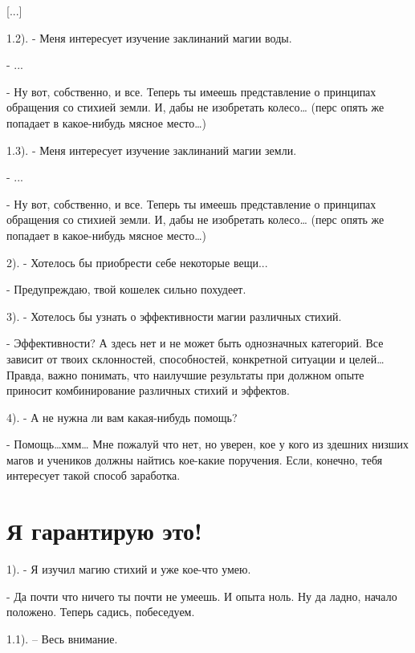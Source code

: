 \documentclass[12pt,a4paper]{book}
\begin{document}
[...]

1.2). - Меня интересует изучение заклинаний магии воды.

- ...

- Ну вот, собственно, и все. Теперь ты имеешь представление о принципах обращения со стихией земли. И, дабы не изобретать колесо… (перс опять же попадает в какое-нибудь мясное место…)

1.3). - Меня интересует изучение заклинаний магии земли.

- ...

- Ну вот, собственно, и все. Теперь ты имеешь представление о принципах обращения со стихией земли. И, дабы не изобретать колесо… (перс опять же попадает в какое-нибудь мясное место…)

2). - Хотелось бы приобрести себе некоторые вещи...

- Предупреждаю, твой кошелек сильно похудеет.

3). - Хотелось бы узнать о эффективности магии различных стихий.

- Эффективности? А здесь нет и не может быть однозначных категорий. Все зависит от твоих склонностей, способностей, конкретной ситуации и целей… Правда, важно понимать, что наилучшие результаты при должном опыте приносит комбинирование различных стихий и эффектов.

4). - А не нужна ли вам какая-нибудь помощь?

- Помощь…хмм… Мне пожалуй что нет, но уверен, кое у кого из здешних низших магов и учеников должны найтись кое-какие поручения. Если, конечно, тебя интересует такой способ заработка.

\section{Я гарантирую это!}

1). - Я изучил магию стихий и уже кое-что умею.

- Да почти что ничего ты почти не умеешь. И опыта ноль. Ну да ладно, начало положено. Теперь садись, побеседуем.

1.1). – Весь внимание.
\end{document}

